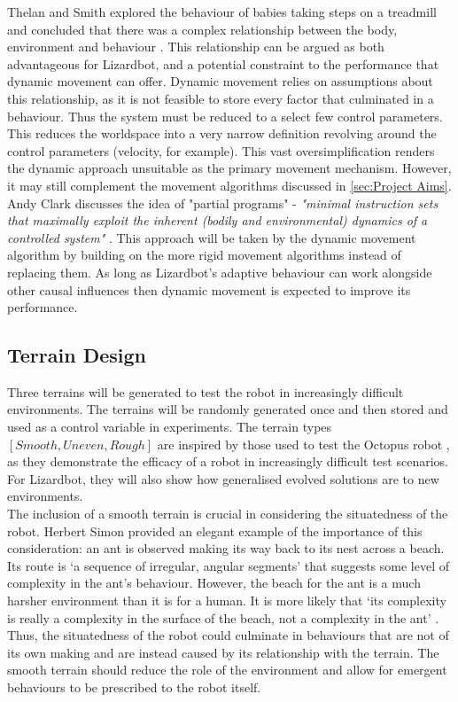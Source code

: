 \documentclass{article}
\begin{document}
Thelan and Smith explored the behaviour of babies taking steps on a treadmill and concluded that there was a complex relationship between the body, environment and behaviour .
This relationship can be argued as both advantageous for Lizardbot, and a potential constraint to the performance that dynamic movement can offer. Dynamic movement relies on assumptions about this relationship, as it is not feasible to store every factor that culminated in a behaviour. Thus the system must be reduced to a select few control parameters. This reduces the worldspace into a very narrow definition revolving around the control parameters (velocity, for example). This vast oversimplification renders the dynamic approach unsuitable as the primary movement mechanism. However, it may still complement the movement algorithms discussed in \autoref{sec:Project Aims}. Andy Clark discusses the idea of "partial programs"  - \textit{"minimal instruction sets that maximally exploit the inherent (bodily and environmental) dynamics of a controlled system"} . This approach will be taken by the dynamic movement algorithm by building on the more rigid movement algorithms instead of replacing them.  As long as Lizardbot's adaptive behaviour can work alongside other causal influences then dynamic movement is expected to improve its performance.
 



\newpage
\subsection{Terrain Design}
\label{sec:Terrain Generation}
Three terrains will be generated to test the robot in increasingly difficult environments. The terrains will be randomly generated once and then stored and used as a control variable in experiments. The terrain types $[Smooth, Uneven, Rough]$ are inspired by those used to test the Octopus robot , as they demonstrate the efficacy of a robot in increasingly difficult test scenarios. For Lizardbot, they will also show how generalised evolved solutions are to new environments. \\

The inclusion of a smooth terrain is crucial in considering the situatedness of the robot. Herbert Simon provided an elegant example of the importance of this consideration: an ant is observed making its way back to its nest across a beach.
Its route is ‘a sequence of irregular, angular segments’ that suggests some level of complexity in the ant's behaviour. However, the beach for the ant is a much harsher environment than it is for a human. It is more likely that ‘its complexity is really a complexity in the surface of the beach, not a complexity in the ant’ . Thus, the situatedness of the robot could culminate in behaviours that are not of its own making and are instead caused by its relationship with the terrain. The smooth terrain should reduce the role of the environment and allow for emergent behaviours to be prescribed to the robot itself.\\
\end{document}

